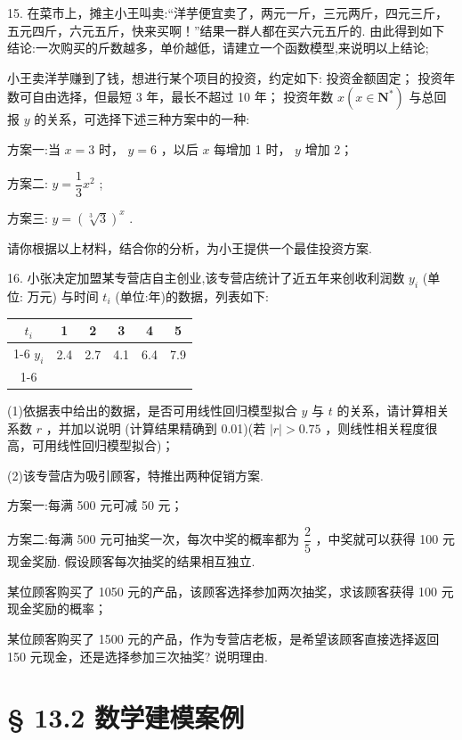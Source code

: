 15.    在菜市上，摊主小王叫卖:“洋芋便宜卖了，两元一斤，三元两斤，四元三斤，五元四斤，六元五斤，快来买啊！”结果一群人都在买六元五斤的. 由此得到如下结论:一次购买的斤数越多，单价越低，请建立一个函数模型,来说明以上结论;

  小王卖洋芋赚到了钱，想进行某个项目的投资，约定如下:  投资金额固定；  投资年数可自由选择，但最短 3 年，最长不超过 10 年；  投资年数 $x\left( {x \in  {\mathbf{N}}^{ * }}\right)$ 与总回报 $y$ 的关系，可选择下述三种方案中的一种:

方案一:当 $x = 3$ 时， $y = 6$ ，以后 $x$ 每增加 1 时， $y$ 增加 2；

方案二: $y = \dfrac{1}{3}{x}^{2}$ ;

方案三: $y = {\left( \sqrt[3]{3}\right) }^{x}$ .

请你根据以上材料，结合你的分析，为小王提供一个最佳投资方案.

16. 小张决定加盟某专营店自主创业,该专营店统计了近五年来创收利润数 ${y}_{i}$ (单位: 万元) 与时间 ${t}_{i}$ (单位:年)的数据，列表如下:

\begin{center}
\begin{tabular}{|c|c|c|c|c|c|}
\hline
${t}_{i}$ & 1 & 2 & 3 & 4 & 5 \\
\cline{1-6}
${y}_{i}$ & 2.4 & 2.7 & 4.1 & 6.4 & 7.9 \\
\cline{1-6}
\hline
\end{tabular}
\end{center}

(1)依据表中给出的数据，是否可用线性回归模型拟合 $y$ 与 $t$ 的关系，请计算相关系数 $r$ ，并加以说明 (计算结果精确到 0.01)(若 $\left| r\right|  > {0.75}$ ，则线性相关程度很高，可用线性回归模型拟合)；

(2)该专营店为吸引顾客，特推出两种促销方案.

方案一:每满 500 元可减 50 元；

方案二:每满 500 元可抽奖一次，每次中奖的概率都为 $\dfrac{2}{5}$ ，中奖就可以获得 100 元现金奖励. 假设顾客每次抽奖的结果相互独立.

  某位顾客购买了 1050 元的产品，该顾客选择参加两次抽奖，求该顾客获得 100 元现金奖励的概率；

  某位顾客购买了 1500 元的产品，作为专营店老板，是希望该顾客直接选择返回 150 元现金，还是选择参加三次抽奖? 说明理由.

\section*{§ 13.2 数学建模案例}

